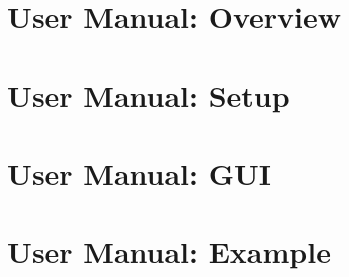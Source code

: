 \chapter[DABC User Manual: Overview]{\dabc\ User Manual: Overview}
 \cleardoublepage
\chapter[DABC User Manual: Setup]{\dabc\ User Manual: Setup}
 \cleardoublepage
\chapter[DABC User Manual: GUI]{\dabc\ User Manual: GUI}
 \cleardoublepage
\chapter[DABC User Manual: Example MBS]{\dabc\ User Manual: Example \mbs}
 \cleardoublepage

